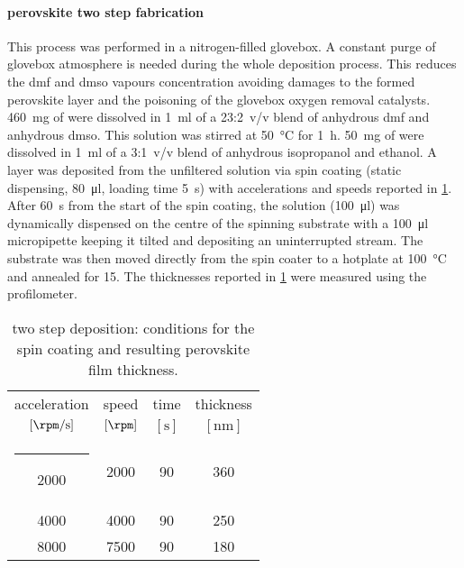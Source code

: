 \paragraph{ perovskite two step fabrication}
This process was performed in a nitrogen-filled glovebox. A constant purge of glovebox atmosphere is needed during the whole deposition process. This reduces the \gls{dmf} and \gls{dmso} vapours concentration avoiding damages to the formed perovskite layer and the poisoning of the glovebox oxygen removal catalysts.
\SI{460}{\mg} of \PbItwo were dissolved in \SI{1}{\ml} of a 23:2~v/v blend of anhydrous \gls{dmf} and anhydrous \gls{dmso}. This solution was stirred at \SI{50}{\celsius} for \SI{1}{\hour}. \SI{50}{\mg} of  were dissolved in \SI{1}{\ml} of a 3:1~v/v blend of anhydrous isopropanol and ethanol. A \PbItwo layer was deposited from the unfiltered solution via spin coating (static dispensing, \SI{80}{\ul}, loading time \SI{5}{\s}) with accelerations and speeds reported in \cref{mapi_thickness}. After \SI{60}{\s} from the start of the spin coating, the  solution (\SI{100}{\ul}) was dynamically dispensed on the centre of the spinning substrate with a \SI{100}{\ul} micropipette keeping it tilted and depositing an uninterrupted stream. The substrate was then moved directly from the spin coater to a hotplate at \SI{100}{\celsius} and annealed for \SI{15}{\min}. The thicknesses reported in \cref{mapi_thickness} were measured using the profilometer.

\begin{table}%
	\caption{ two step deposition: conditions for the \PbItwo spin coating and resulting perovskite film thickness.}\label{mapi_thickness}
	\begin{center}
		\begin{tabular}{c c c | c}
			acceleration    & speed     & time    & thickness \\
			$[\si{\rpm\per\s}]$ & $[\si{\rpm}]$ & $[\si{\s}]$ & $[\si{\nm}]$  \\
			\hline
			\rule[0ex]{-4pt}{3ex}
			2000            & 2000      & 90      & 360       \\
			4000            & 4000      & 90      & 250       \\
			8000            & 7500      & 90      & 180       \\
		\end{tabular}
	\end{center}
\end{table}

